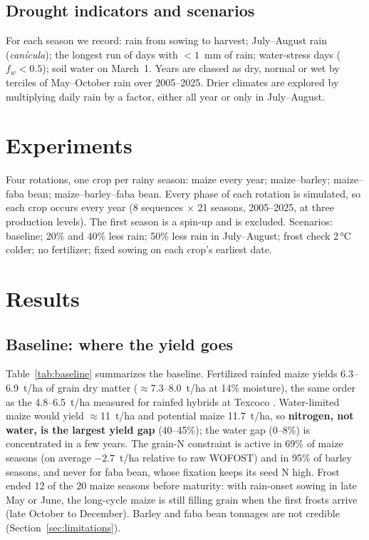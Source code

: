 \documentclass[11pt,a4paper]{article}
\begin{document}
\subsection{Drought indicators and scenarios}
For each season we record: rain from sowing to harvest; July--August rain (\emph{canícula}); the longest run of days
with \(<1\)~mm of rain; water-stress days (\(f_w < 0.5\)); soil water on March~1. Years are classed as dry, normal or
wet by terciles of May--October rain over 2005--2025. Drier climates are explored by multiplying daily rain by a
factor, either all year or only in July--August.

\section{Experiments}\label{sec:experiments}

Four rotations, one crop per rainy season: maize every year; maize--barley; maize--faba bean;
maize--barley--faba bean. Every phase of each rotation is simulated, so each crop occurs every year
(8 sequences \(\times\) 21 seasons, 2005--2025, at three production levels). The first season is a spin-up and is
excluded. Scenarios: baseline; 20\% and 40\% less rain; 50\% less rain in July--August; frost check 2\,°C colder; no
fertilizer; fixed sowing on each crop's earliest date.

\section{Results}\label{sec:results}

\subsection{Baseline: where the yield goes}


Table~\ref{tab:baseline} summarizes the baseline. Fertilized rainfed maize yields 6.3--6.9~t/ha of grain dry matter
(\(\approx\)7.3--8.0~t/ha at 14\% moisture), the same order as the 4.8--6.5~t/ha measured for rainfed hybrids at
Texcoco \citep{alonso2023terra}. Water-limited maize would yield \(\approx\)11~t/ha and potential maize 11.7~t/ha, so
\textbf{nitrogen, not water, is the largest yield gap} (40--45\%); the water gap (0--8\%) is concentrated in a few
years. The grain-N constraint is active in 69\% of maize seasons (on average $-2.7$~t/ha relative to raw WOFOST) and
in 95\% of barley seasons, and never for faba bean, whose fixation keeps its seed N high. Frost ended 12 of the 20
maize seasons before maturity: with rain-onset sowing in late May or June, the long-cycle maize is still filling
grain when the first frosts arrive (late October to December). Barley and faba bean tonnages are not credible
(Section~\ref{sec:limitations}).
\end{document}
